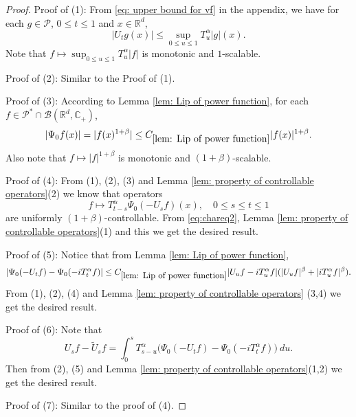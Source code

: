 \documentclass[12pt,oneside,english]{amsart}
\theoremstyle{plain}
\theoremstyle{definition}
\numberwithin{equation}{section}
\begin{document}
\begin{proof}
    Proof of (1): From \eqref{eq: upper bound for vf} in the appendix, we have for each $g\in \mathcal P$, $0\leq t\leq 1$ and $x\in \mathbb R^d$,
\[
    |U_t g(x)|
    \leq \sup_{0\leq u\leq 1}T_u^\alpha |g| (x).
\]
    Note that $f\mapsto\sup_{0\leq u\leq 1}T^{\alpha}_u|f|$ is monotonic and $1$-scalable.

    Proof of (2): Similar to the Proof of (1).

    Proof of (3): According to Lemma \ref{lem: Lip of power function}, for each $f\in \mathcal P^* \cap \mathcal B(\mathbb R^d, \mathbb C_+)$,
\[
    |\Psi_0 f(x)| = |f(x)^{1+\beta}| \leq C_{\ref{lem: Lip of power function}} |f(x)|^{1+\beta}.
\]
    Also note that $f\mapsto |f|^{1+\beta}$ is monotonic and $(1+\beta)$-scalable.

    Proof of (4): From (1), (2), (3) and Lemma \ref{lem: property of controllable operators}(2) we know that operators
\[
    f
    \mapsto T^{\alpha}_{t-s}\Psi_0(-U_sf)(x),
    \quad 0\leq s\leq t\leq 1
\]
    are uniformly $(1+\beta)$-controllable.
    From \eqref{eq:chareq2}, Lemma \ref{lem: property of controllable operators}(1) and this we get the desired result.

    Proof of (5): Notice that from Lemma \ref{lem: Lip of power function},
\[
    |\Psi_0(-U_t f) - \Psi_0(-iT_t^\alpha f) |
    \leq  C_{\ref{lem: Lip of power function}} |U_u f-iT_u^{\alpha}f|(|U_u f|^{\beta}+|i T_u^{\alpha}f|^{\beta}).
\]
    From (1), (2), (4) and Lemma \ref{lem: property of controllable operators} (3,4) we get the desired result.

    Proof of (6): Note that
\[
    U_sf - \tilde U_sf
    = \int_0^s T_{s-u}^{\alpha}\big(\Psi_0(-U_t f)-\Psi_0(-i T_t^{\alpha}f)\big)~du.
\]
    Then from (2), (5) and Lemma \ref{lem: property of controllable operators}(1,2) we get the desired result.

    Proof of (7): Similar to the proof of (4).
\end{proof}
\end{document}
